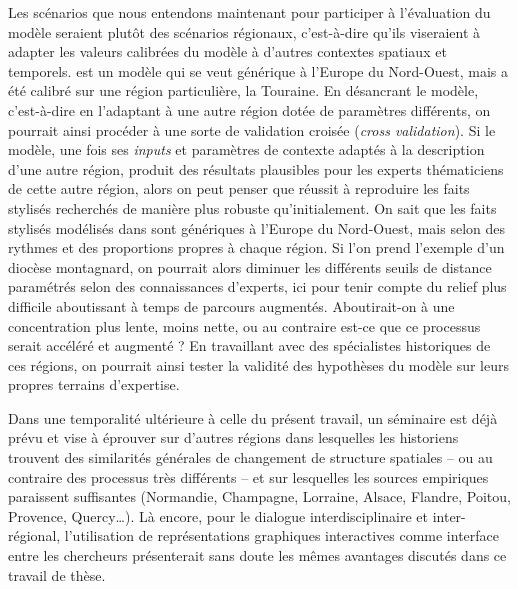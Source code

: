 \noindent Les scénarios que nous entendons maintenant pour participer à l'évaluation du modèle seraient plutôt des scénarios régionaux, c'est-à-dire qu'ils viseraient à adapter les valeurs calibrées du modèle à d'autres contextes spatiaux et temporels.
\simfeodal{} est un modèle qui se veut générique à l'Europe du Nord-Ouest, mais a été calibré sur une région particulière, la Touraine.
En désancrant le modèle, c'est-à-dire en l'adaptant à une autre région dotée de paramètres différents, on pourrait ainsi procéder à une sorte de validation croisée (\textit{cross validation}).
Si le modèle, une fois ses \textit{inputs} et paramètres de contexte adaptés à la description d'une autre région, produit des résultats plausibles pour les experts thématiciens de cette autre région, alors on peut penser que \simfeodal{} réussit à reproduire les faits stylisés recherchés de manière plus robuste qu'initialement.
On sait que les faits stylisés modélisés dans \simfeodal{} sont génériques à l'Europe du Nord-Ouest, mais selon des rythmes et des proportions propres à chaque région.
Si l'on prend l'exemple d'un diocèse montagnard, on pourrait alors diminuer les différents seuils de distance paramétrés selon des connaissances d'experts, ici pour tenir compte du relief plus difficile aboutissant à temps de parcours augmentés.
Aboutirait-on à une concentration plus lente, moins nette, ou au contraire est-ce que ce processus serait accéléré et augmenté ?
En travaillant avec des spécialistes historiques de ces régions, on pourrait ainsi tester la validité des hypothèses du modèle sur leurs propres terrains d'expertise.

Dans une temporalité ultérieure à celle du présent travail, un séminaire est déjà prévu et vise à éprouver \simfeodal{} sur d'autres régions dans lesquelles les historiens trouvent des similarités générales de changement de structure spatiales -- ou au contraire des processus très différents -- et sur lesquelles les sources empiriques paraissent suffisantes (Normandie, Champagne, Lorraine, Alsace, Flandre, Poitou, Provence, Quercy\ldots).
Là encore, pour le dialogue interdisciplinaire et inter-régional, l'utilisation de représentations graphiques interactives comme interface entre les chercheurs présenterait sans doute les mêmes avantages discutés dans ce travail de thèse.


